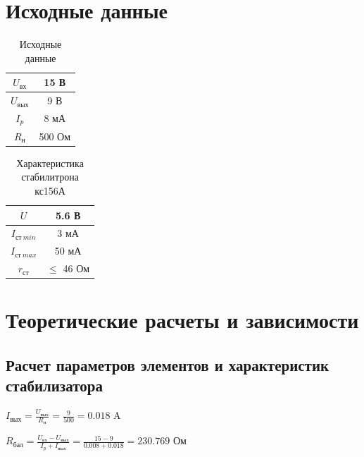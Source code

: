 \section{Исходные данные}

\begin{table}[H]
	\begin{center}
	\caption{Исходные данные}
	\def\arraystretch{1.2}
		\begin{tabular}{|c|c|}
		\hline 
		$U_\text{вх}$ & 15 В \\ 
		\hline 
		$U_\text{вых}$ & 9 В \\ 
		\hline 
		$I_p$ & 8 мА \\ 
		\hline 
		$R_\text{н}$ & 500 Ом \\ 
		\hline 
		\end{tabular} 
		\label{tab:3:1}
	\end{center}
\end{table}

\begin{table}[H]
	\begin{center}
	\caption{Характеристика стабилитрона кс156А}
	\def\arraystretch{1.2}
		\begin{tabular}{|c|c|}
		\hline 
		$U$ & 5.6 В \\ 
		\hline 
		$I_{\text{ст}\ min}$ & 3 мА \\ 
		\hline 
		$I_{\text{ст}\ max}$ & 50 мА \\ 
		\hline 
		$r_{\text{ст}}$ & $\leq$ 46 Ом \\ 
		\hline 
		\end{tabular} 
		\label{tab:3:2}
	\end{center}
\end{table}


\section{Теоретические расчеты и зависимости}

\subsection{Расчет параметров элементов и характеристик стабилизатора}
$I_\text{вых} = \frac{U_\text{вых}}{R_\text{н}} = \frac{9}{500} = 0.018$ A

$R_\text{бал} = \frac{U_\text{вх} - U_\text{вых}}{I_p + I_\text{вых}} = \frac{15 - 9}{0.008 + 0.018} = 230.769$ Ом

